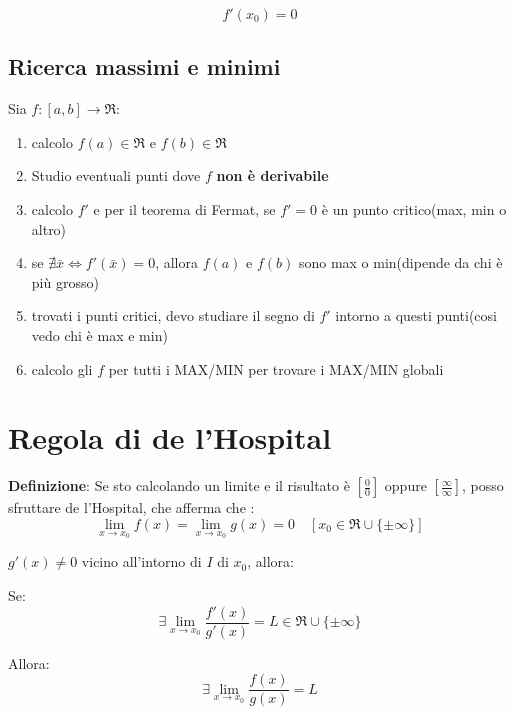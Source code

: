 \documentclass{article}
\begin{document}
    \begin{equation*}
        f'(x_0) = 0
    \end{equation*}



    \subsection{Ricerca massimi e minimi}

    Sia $f: [a, b] \rightarrow \Re$:

    \begin{enumerate}
        \item calcolo $f(a) \in \Re$ e $f(b) \in \Re$
        \item Studio eventuali punti dove $f$ \textbf{non è derivabile}
        \item calcolo $f'$ e per il teorema di Fermat, se $f'=0$ è un punto critico(max, min o altro)
        \item se $\nexists \bar{x} \Leftrightarrow f'(\bar{x}) = 0$, allora $f(a)$ e $f(b)$ sono max o min(dipende da chi è più grosso)
        \item trovati i punti critici, devo studiare il segno di $f'$ intorno a questi punti(cosi vedo chi è max e min)
        \item calcolo gli $f$ per tutti i MAX/MIN per trovare i MAX/MIN globali 
    \end{enumerate}


    \section{Regola di de l'Hospital}

    \textbf{Definizione}:
    Se sto calcolando un limite e il risultato è $[\frac{0}{0}]$ oppure $[\frac{\infty}{\infty}]$, posso sfruttare 
    de l'Hospital, che afferma che :
    \begin{equation*}
        \lim_{x \rightarrow x_0} f(x) = \lim_{x \rightarrow x_0} g(x) = 0 \quad [x_0 \in \Re \cup \{\pm \infty\}] 
    \end{equation*}

    $g'(x) \neq 0$ vicino all'intorno di $I$ di $x_0$, allora:

    Se:
    \begin{equation*}
        \exists \lim_{x \rightarrow x_0} \frac{f'(x)}{g'(x)}  = L \in \Re \cup \{\pm \infty\}
    \end{equation*}

    Allora:
    \begin{equation*}
        \exists  \lim_{x \rightarrow x_0} \frac{f(x)}{g(x)}  = L 
    \end{equation*}
\end{document}
